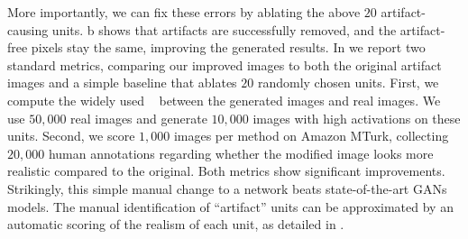 \documentclass{article} %
\begin{document}
% 
More importantly, we can fix these errors by ablating the above $20$ artifact-causing units. b shows that artifacts are successfully removed, and the artifact-free pixels stay the same, improving the generated results. In  we report two standard metrics, comparing our improved images to both the original artifact images and a simple baseline that ablates $20$ randomly chosen units. First, we compute the widely used \fid~\citep{heusel2017gans} between the generated images and real images. We use $50,000$ real images and generate $10,000$ images with high activations on these units. Second, we score $1,000$ images per method on Amazon MTurk, collecting $20,000$ human annotations regarding whether  the modified image looks more realistic compared to the original.  Both metrics show significant improvements.   Strikingly, this simple manual change to a network beats state-of-the-art GANs models.  The manual identification of ``artifact'' units can be approximated by an automatic scoring of the realism of each unit, as detailed in .
\end{document}
